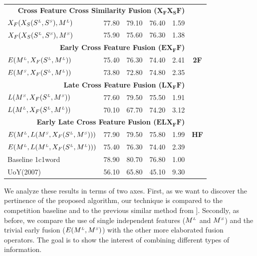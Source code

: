 \begin{table}[htp!]
\begin{tabular}{@{}lrrrrc@{}}
 \midrule
       \multicolumn{5}{r}{\textbf{Cross Feature Cross Similarity Fusion ($\mathbf{X_FX_SF}$)}}   & \multirow{9}{*}{\textbf{2F}}    \\ %

       $X_F(X_S(S^{\scriptscriptstyle L}, S^{\scriptscriptstyle S}), M^{\scriptscriptstyle L})$		&	77.80	&79.10  & 76.40& 1.59 \\	   
       $X_F(X_S(S^{\scriptscriptstyle L}, S^{\scriptscriptstyle S}), M^{\scriptscriptstyle S})$		&	75.90	& 75.60 & 76.30 & 1.38 \\	   
       \multicolumn{5}{r}{\textbf{Early Cross Feature Fusion ($\mathbf{EX_FF}$)}}       \\ %
       
       $E(M^{\scriptscriptstyle L}, X_F(S^{\scriptscriptstyle L}, M^{\scriptscriptstyle L}))$		&	75.40	& 76.30  & 74.40 & 2.41 \\	   
	   $E(M^{\scriptscriptstyle S}, X_F(S^{\scriptscriptstyle L}, M^{\scriptscriptstyle L}))$		&	73.80	& 72.80  & 74.80 & 2.35 \\	   
       \multicolumn{5}{r}{\textbf{Late Cross Feature Fusion ($\mathbf{LX_FF}$)}}       \\ %
	   $L(M^{\scriptscriptstyle S}, X_F(S^{\scriptscriptstyle L}, M^{\scriptscriptstyle S}))$		&	77.60	& 79.50	 & 75.50 & 1.91 \\	   
	   $L(M^{\scriptscriptstyle L}, X_F(S^{\scriptscriptstyle L}, M^{\scriptscriptstyle L}))$		&	70.10	& 67.70 & 74.20 & 3.12 \\	   
       \midrule
       \multicolumn{5}{r}{\textbf{Early Late Cross Feature Fusion ($\mathbf{ELX_FF	}$)}}    & \multirow{3}{*}{\textbf{HF}}   \\ %
	   $E(M^{\scriptscriptstyle L}, L(M^{\scriptscriptstyle S}, X_F(S^{\scriptscriptstyle L}, M^{\scriptscriptstyle S})))$		&	77.90	& 79.50 & 75.80& 1.99 \\	   
	   $E(M^{\scriptscriptstyle L}, L(M^{\scriptscriptstyle L}, X_F(S^{\scriptscriptstyle L}, M^{\scriptscriptstyle L})))$		&	75.40	& 76.30&74.40 & 2.39 \\
	   \midrule
	   \midrule
	   Baseline 1c1word 		&	78.90	& 80.70&76.80 & 1.00 \\ 	   	 	    	   
	   UoY(2007)	&	56.10	& 65.80 &45.10 & 9.30 \\ 	 

		   
       \bottomrule
\end{tabular}
\end{table}

We analyze these results in terms of two  axes. First, as we want to discover the pertinence of the proposed algorithm,  our technique is compared to the competition baseline and to the previous similar method from ]\cite{2007.Klapaftis.UoY}. Secondly, as before, we compare the use of single independent features ($M^{\scriptscriptstyle L}$ and $M^{\scriptscriptstyle S}$) and the trivial early fusion ($E(M^{\scriptscriptstyle L}, M^{\scriptscriptstyle S})$) with the other more elaborated fusion operators. The goal is to show the interest of combining different types of information.

